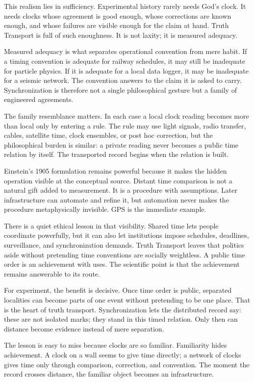 This realism lies in sufficiency. Experimental history rarely needs God's
clock. It needs clocks whose agreement is good enough, whose corrections
are known enough, and whose failures are visible enough for the claim at
hand. Truth Transport is full of such enoughness. It is not laxity; it is
measured adequacy.

Measured adequacy is what separates operational convention from mere
habit. If a timing convention is adequate for railway schedules, it may
still be inadequate for particle physics. If it is adequate for a local
data logger, it may be inadequate for a seismic network. The convention
answers to the claim it is asked to carry. Synchronization is therefore
not a single philosophical gesture but a family of engineered agreements.

The family resemblance matters. In each case a local clock reading
becomes more than local only by entering a rule. The rule may use light
signals, radio transfer, cables, satellite time, clock ensembles, or post
hoc correction, but the philosophical burden is similar: a private
reading never becomes a public time relation by itself. The transported
record begins when the relation is built.

Einstein's 1905 formulation remains powerful because it makes the hidden
operation visible at the conceptual source. Distant time comparison is
not a natural gift added to measurement. It is a procedure with
assumptions. Later infrastructure can automate and refine it, but
automation never makes the procedure metaphysically invisible. GPS is
the immediate example.

There is a quiet ethical lesson in that visibility. Shared time lets
people coordinate powerfully, but it can also let institutions impose
schedules, deadlines, surveillance, and synchronization demands. Truth
Transport leaves that politics aside without pretending time conventions
are socially weightless. A public time order is an achievement with
uses. The scientific point is that the achievement remains answerable to
its route.

For experiment, the benefit is decisive. Once time order is public,
separated localities can become parts of one event without pretending to
be one place. That is the heart of truth transport. Synchronization lets
the distributed record say: these are not isolated marks; they stand in
this timed relation. Only then can distance become evidence instead of
mere separation.

The lesson is easy to miss because clocks are so familiar. Familiarity
hides achievement. A clock on a wall seems to give time directly; a
network of clocks gives time only through comparison, correction, and
convention. The moment the record crosses distance, the familiar object
becomes an infrastructure.

